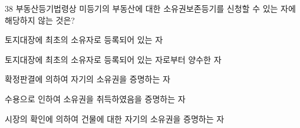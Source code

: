 \begin{question}{38}
부동산등기법령상 미등기의 부동산에 대한 소유권보존등기를 신청할 수 있는 자에 해당하지 않는 것은?
\begin{choices}
  \item 토지대장에 최초의 소유자로 등록되어 있는 자
  \item 토지대장에 최초의 소유자로 등록되어 있는 자로부터 양수한 자
  \item 확정판결에 의하여 자기의 소유권을 증명하는 자
  \item 수용으로 인하여 소유권을 취득하였음을 증명하는 자
  \item 시장의 확인에 의하여 건물에 대한 자기의 소유권을 증명하는 자
\end{choices}
\end{question}
